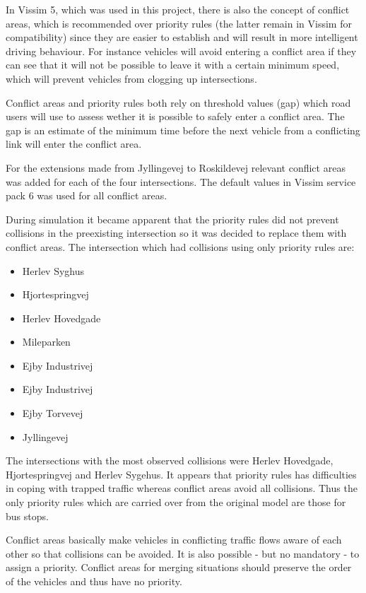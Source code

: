 In Vissim 5, which was used in this project, there is also the concept of conflict areas, which is recommended over priority rules (the latter remain in Vissim for compatibility) since they are easier to establish and will result in more intelligent driving behaviour. For instance vehicles will avoid entering a conflict area if they can see that it will not be possible to leave it with a certain minimum speed, which will prevent vehicles from clogging up intersections.

Conflict areas and priority rules both rely on threshold values (gap) which road users will use to assess wether it is possible to safely enter a conflict area. The gap is an estimate of the minimum time before the next vehicle from a conflicting link will enter the conflict area.

For the extensions made from Jyllingevej to Roskildevej relevant conflict areas was added for each of the four intersections. The default values in Vissim service pack 6 was used for all conflict areas.

During simulation it became apparent that the priority rules did not prevent collisions in the preexisting intersection so it was decided to replace them with conflict areas. The intersection which had collisions using only priority rules are:

\begin{itemize}
\item Herlev Syghus
\item Hjortespringvej
\item Herlev Hovedgade
\item Mileparken
\item Ejby Industrivej
\item Ejby Industrivej
\item Ejby Torvevej
\item Jyllingevej
\end{itemize}

The intersections with the most observed collisions were Herlev Hovedgade, Hjortespringvej and Herlev Sygehus. It appears that priority rules has difficulties in coping with trapped traffic whereas conflict areas avoid all collisions.
Thus the only priority rules which are carried over from the original model are those for bus stops. 

Conflict areas basically make vehicles in conflicting traffic flows aware of each other so that collisions can be avoided. It is also possible - but no mandatory - to assign a priority. Conflict areas for merging situations should preserve the order of the vehicles and thus have no priority. 

